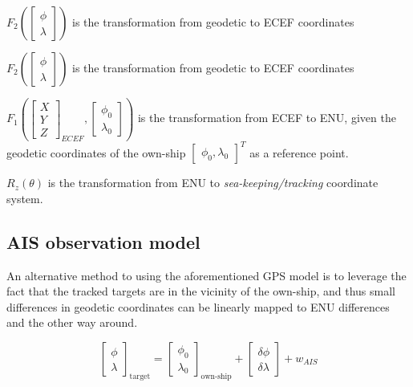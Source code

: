 \begin{description}
	\item $F_2\left(\begin{bmatrix}
	\phi \\
	\lambda
	\end{bmatrix}\right)$ is the transformation from geodetic to ECEF coordinates
	\item $F_2\left(\begin{bmatrix}
	\phi \\
	\lambda
	\end{bmatrix}\right)$ is the transformation from geodetic to ECEF coordinates
	\item $F_1\left( \begin{bmatrix}
	X \\
	Y \\
	Z
	\end{bmatrix}_{ECEF},\begin{bmatrix}
	\phi_0 \\
	\lambda_0
	\end{bmatrix}\right)$ is the transformation from ECEF to ENU, given the geodetic coordinates of the own-ship $\begin{bmatrix}
	\phi_0,
	\lambda_0
	\end{bmatrix}^T$ as a reference point.
	\item $R_z(\theta)$ is the transformation from ENU to \emph{sea-keeping/tracking }coordinate system.
\end{description}

\subsection{AIS observation model}

An alternative method to using the aforementioned GPS model is to leverage the fact that the tracked targets are in the vicinity of the own-ship, and thus small differences in geodetic coordinates can be linearly mapped to ENU differences and the other way around\cite{Wellenhof1997}.



\begin{equation}
	\begin{bmatrix}
		\phi\\ \lambda
		\end{bmatrix}_{\text{target}}=
		\begin{bmatrix}
		\phi_{0}\\ \lambda_{0}
	\end{bmatrix}_{\text{own-ship}} + \begin{bmatrix}
	\delta\phi \\ \delta\lambda
	\end{bmatrix} + w_{\textit{AIS}}
\end{equation}


